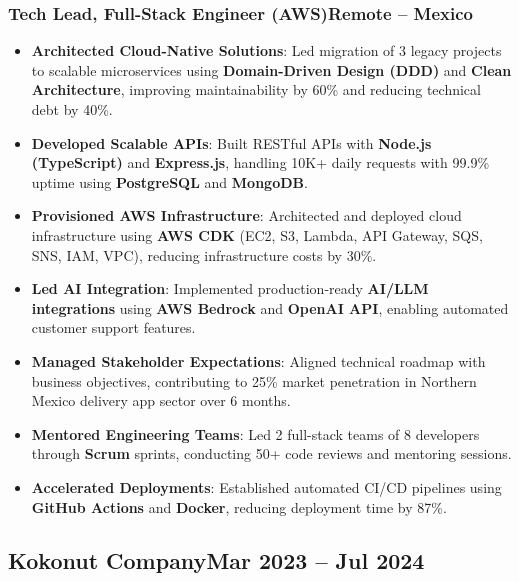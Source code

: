\documentclass[a4paper,10pt]{article}
\newcommand{\kw}[1]{\textbf{\textcolor{keyword}{#1}}}
\newcommand{\tech}[1]{\textbf{\textcolor{tech}{#1}}}
\begin{document}
\subsubsection*{Tech Lead, Full-Stack Engineer (AWS)\hfill Remote -- Mexico}
\begin{itemize}[noitemsep, leftmargin=*]
    \item \textbf{Architected Cloud-Native Solutions}: Led migration of 3 legacy projects to scalable microservices using \kw{Domain-Driven Design (DDD)} and \kw{Clean Architecture}, improving maintainability by 60\% and reducing technical debt by 40\%.
    \item \textbf{Developed Scalable APIs}: Built RESTful APIs with \tech{Node.js (TypeScript)} and \tech{Express.js}, handling 10K+ daily requests with 99.9\% uptime using \kw{PostgreSQL} and \kw{MongoDB}.
    \item \textbf{Provisioned AWS Infrastructure}: Architected and deployed cloud infrastructure using \tech{AWS CDK} (EC2, S3, Lambda, API Gateway, SQS, SNS, IAM, VPC), reducing infrastructure costs by 30\%.
    \item \textbf{Led AI Integration}: Implemented production-ready \kw{AI/LLM integrations} using \tech{AWS Bedrock} and \kw{OpenAI API}, enabling automated customer support features.
    \item \textbf{Managed Stakeholder Expectations}: Aligned technical roadmap with business objectives, contributing to 25\% market penetration in Northern Mexico delivery app sector over 6 months.
    \item \textbf{Mentored Engineering Teams}: Led 2 full-stack teams of 8 developers through \kw{Scrum} sprints, conducting 50+ code reviews and mentoring sessions.
    \item \textbf{Accelerated Deployments}: Established automated CI/CD pipelines using \tech{GitHub Actions} and \tech{Docker}, reducing deployment time by 87\%.
\end{itemize}

\subsection*{Kokonut Company\hfill\textbf{Mar 2023 -- Jul 2024}}
\end{document}
